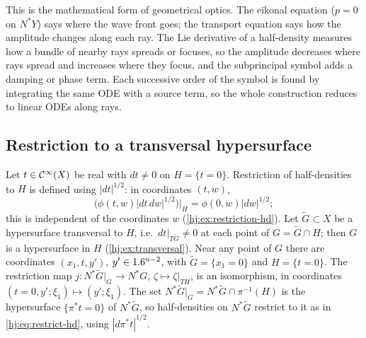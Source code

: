 \begin{discussion}
This is the mathematical form of geometrical optics. The eikonal equation
($p=0$ on $N^*Y$) says where the wave front goes; the transport equation says how
the amplitude changes along each ray. The Lie derivative of a half-density measures
how a bundle of nearby rays spreads or focuses, so the amplitude decreases where rays
spread and increases where they focus, and the subprincipal symbol adds a damping or
phase term. Each successive order of the symbol is found by integrating the same ODE
with a source term, so the whole construction reduces to linear ODEs along rays.
\end{discussion}

\subsection{Restriction to a transversal hypersurface}
Let $t\in\mathcal{C}^\infty(X)$ be real with $dt\neq0$ on $H=\{t=0\}$.  Restriction of
half-densities to $H$ is defined using $|dt|^{1/2}$: in coordinates $(t,w)$,
\begin{equation}\label{hj:eq:restrict-hd}
  \big(\phi(t,w)|dt\,dw|^{1/2}\big)\big|_H=\phi(0,w)|dw|^{1/2};
\end{equation}
this is independent of the coordinates $w$ (\cref{hj:ex:restriction-hd}).  Let
$\tilde G\subset X$ be a hypersurface transversal to $H$, i.e.\ $dt|_{T\tilde
G}\ne0$ at each point of $G=\tilde G\cap H$; then $G$ is a hypersurface in $H$
(\cref{hj:ex:transversal}).  Near any point of $G$ there are coordinates
$(x_1,t,y')$, $y'\in1.6^{n-2}$, with $\tilde G=\{x_1=0\}$ and $H=\{t=0\}$.  The
restriction map $j:N^*\tilde G|_G\to N^*G$, $\zeta\mapsto\zeta|_{TH}$, is an
isomorphism, in coordinates $(t=0,y';\xi_1)\mapsto(y';\xi_1)$.  The set
$N^*\tilde G|_G=N^*\tilde G\cap\pi^{-1}(H)$ is the hypersurface
$\{\pi^*t=0\}$ of $N^*\tilde G$, so half-densities on $N^*\tilde G$ restrict to
it as in \eqref{hj:eq:restrict-hd}, using $|d\pi^*t|^{1/2}$.

